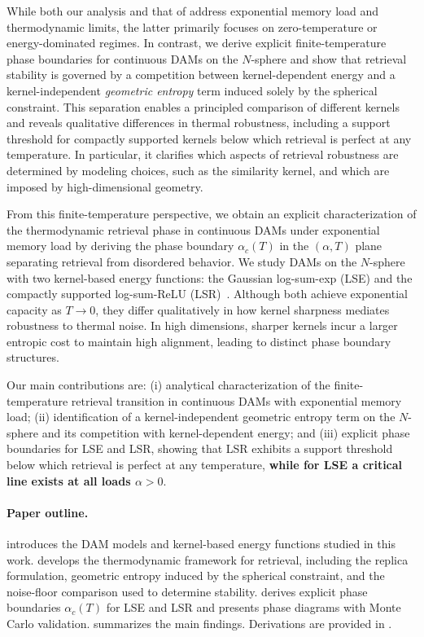 \documentclass{article}
\theoremstyle{plain}
\theoremstyle{definition}
\theoremstyle{remark}
\begin{document}
While both our analysis and that of \citet{lucibello2024exponential} address exponential memory load and thermodynamic limits, the latter primarily focuses on zero-temperature or energy-dominated regimes. In contrast, we derive explicit finite-temperature phase boundaries for continuous DAMs on the $N$-sphere and show that retrieval stability is governed by a competition between kernel-dependent energy and a kernel-independent \emph{geometric entropy} term induced solely by the spherical constraint. This separation enables a principled comparison of different kernels and reveals qualitative differences in thermal robustness, including a support threshold for compactly supported kernels below which retrieval is perfect at any temperature. In particular, it clarifies which aspects of retrieval robustness are determined by modeling choices, such as the similarity kernel, and which are imposed by high-dimensional geometry.

From this finite-temperature perspective, we obtain an explicit characterization of the thermodynamic retrieval phase in continuous DAMs under exponential memory load by deriving the phase boundary $\alpha_c(T)$ in the $(\alpha,T)$ plane separating retrieval from disordered behavior. We study DAMs on the $N$-sphere with two kernel-based energy functions: the Gaussian log-sum-exp (LSE) and the compactly supported log-sum-ReLU (LSR)~\citep{hoover2025dense}. Although both achieve exponential capacity as $T \to 0$, they differ qualitatively in how kernel sharpness mediates robustness to thermal noise. In high dimensions, sharper kernels incur a larger entropic cost to maintain high alignment, leading to distinct phase boundary structures.

Our main contributions are: (i) analytical characterization of the finite-temperature retrieval transition in continuous DAMs with exponential memory load; (ii) identification of a kernel-independent geometric entropy term on the $N$-sphere and its competition with kernel-dependent energy; and (iii) explicit phase boundaries for LSE and LSR, showing that LSR exhibits a support threshold below which retrieval is perfect at any temperature, \textbf{while for LSE a critical line exists at all loads $\alpha > 0$}.

\paragraph{Paper outline.}
 introduces the DAM models and kernel-based energy functions studied in this work. 
 develops the thermodynamic framework for retrieval, including the replica formulation, geometric entropy induced by the spherical constraint, and the noise-floor comparison used to determine stability. 
 derives explicit phase boundaries $\alpha_c(T)$ for LSE and LSR and presents phase diagrams with Monte Carlo validation. 
 summarizes the main findings. 
Derivations are provided in .
\end{document}
